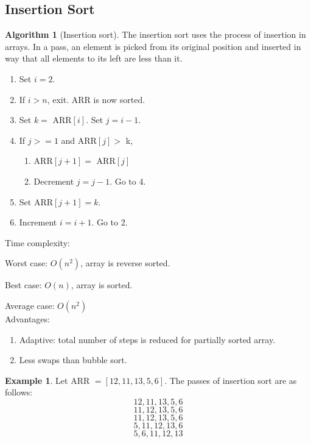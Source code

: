 \documentclass[10pt, a4paper]{extarticle}
\theoremstyle{definition}
\newtheorem{alg}{Algorithm}
\newtheorem{eg}{Example}
\begin{document}
	\subsection{Insertion Sort}
	\begin{alg}[Insertion sort]
		The insertion sort uses the process of insertion in arrays. In a pass, an element is picked from its original position and inserted in way that all elements to its left are less than it.
		\begin{enumerate}
			\item Set $i=2$.
			\item If $i>n$, exit. ARR is now sorted.
			\item Set $k=$ ARR$[i]$. Set $j=i-1$.
			\item If $j>=1$ and ARR$[j]>$ k,
				\begin{enumerate}
					\item ARR$[j+1]=$ ARR$[j]$
					\item Decrement $j=j-1$. Go to 4.
			\end{enumerate}
			\item Set ARR$[j+1]=k$.
			\item Increment $i=i+1$. Go to 2.
	\end{enumerate}
		Time complexity:

		Worst case: $O(n^2)$, array is reverse sorted.

		Best case: $O(n)$, array is sorted.

		Average case: $O(n^2)$
		\hfill\\
		Advantages:
		\begin{enumerate}
			\item Adaptive: total number of steps is reduced for partially sorted array.
			\item Less swaps than bubble sort.
	\end{enumerate}
	\end{alg}
	\begin{eg}
		Let ARR $=[12,11,13,5,6]$. The passes of insertion sort are as follows:
		\[12,\boxed{11},13,5,6\]
		\[11,12,\boxed{13},5,6\]
		\[11,12,13,\boxed{5},6\]
		\[5,11,12,13,\boxed{6}\]
		\[5,6,11,12,13\]
	\end{eg}
\end{document}
